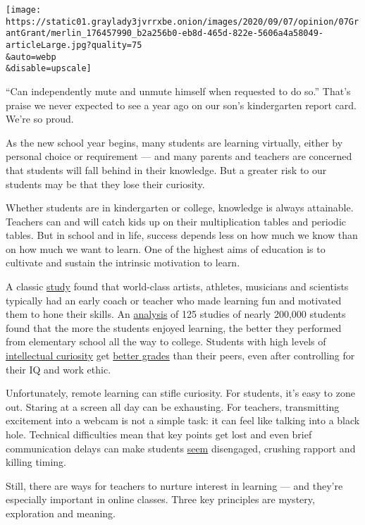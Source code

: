 \texttt{[image: https://static01.graylady3jvrrxbe.onion/images/2020/09/07/opinion/07GrantGrant/merlin\_176457990\_b2a256b0-eb8d-465d-822e-5606a4a58049-articleLarge.jpg?quality=75\\\&auto=webp\\\&disable=upscale]}

``Can independently mute and unmute himself when requested to do so.''
That's praise we never expected to see a year ago on our son's
kindergarten report card. We're so proud.

As the new school year begins, many students are learning virtually,
either by personal choice or requirement --- and many parents and
teachers are concerned that students will fall behind in their
knowledge. But a greater risk to our students may be that they lose
their curiosity.

Whether students are in kindergarten or college, knowledge is always
attainable. Teachers can and will catch kids up on their multiplication
tables and periodic tables. But in school and in life, success depends
less on how much we know than on how much we want to learn. One of the
highest aims of education is to cultivate and sustain the intrinsic
motivation to learn.

A classic
\href{https://www.amazon.com/Developing-Talent-Young-People-Benjamin/dp/034531509X}{study}
found that world-class artists, athletes, musicians and scientists
typically had an early coach or teacher who made learning fun and
motivated them to hone their skills. An
\href{https://psycnet.apa.org/buy/2014-03897-001}{analysis} of 125
studies of nearly 200,000 students found that the more the students
enjoyed learning, the better they performed from elementary school all
the way to college. Students with high levels of
\href{https://journals.sagepub.com/doi/abs/10.1177/1745691611421204}{intellectual
curiosity} get
\href{https://psycnet.apa.org/record/2017-57172-001}{better grades} than
their peers, even after controlling for their IQ and work ethic.

Unfortunately, remote learning can stifle curiosity. For students, it's
easy to zone out. Staring at a screen all day can be exhausting. For
teachers, transmitting excitement into a webcam is not a simple task: it
can feel like talking into a black hole. Technical difficulties mean
that key points get lost and even brief communication delays can make
students
\href{https://www.sciencedirect.com/science/article/abs/pii/S1071581914000287}{seem}
disengaged, crushing rapport and killing timing.

Still, there are ways for teachers to nurture interest in learning ---
and they're especially important in online classes. Three key principles
are mystery, exploration and meaning.

